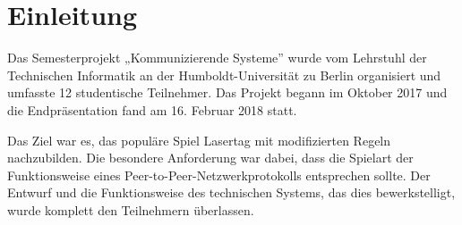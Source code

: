 \section{Einleitung}

Das Semesterprojekt „Kommunizierende Systeme” wurde vom Lehrstuhl der Technischen Informatik an der
Humboldt-Universität zu Berlin organisiert und umfasste 12 studentische Teilnehmer.
Das Projekt begann im Oktober 2017 und die Endpräsentation fand am 16. Februar 2018 statt.

Das Ziel war es, das populäre Spiel Lasertag mit modifizierten Regeln nachzubilden.
Die besondere Anforderung war dabei, dass die Spielart der Funktionsweise eines
Peer-to-Peer-Netzwerkprotokolls entsprechen sollte.
Der Entwurf und die Funktionsweise des technischen Systems, das dies bewerkstelligt, wurde komplett
den Teilnehmern überlassen.
